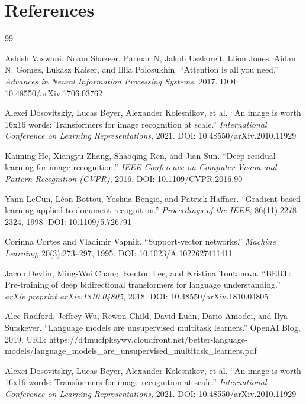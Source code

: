 \documentclass{article}
\begin{document}
\section{References}

\begin{thebibliography}{99}


Ashish Vaswani, Noam Shazeer, Parmar N, Jakob Uszkoreit, Llion Jones, Aidan N. Gomez, Łukasz Kaiser, and Illia Polosukhin.
``Attention is all you need.''
\textit{Advances in Neural Information Processing Systems}, 2017.
DOI: 10.48550/arXiv.1706.03762

Alexei Dosovitskiy, Lucas Beyer, Alexander Kolesnikov, et al.
``An image is worth 16x16 words: Transformers for image recognition at scale.''
\textit{International Conference on Learning Representations}, 2021.
DOI: 10.48550/arXiv.2010.11929

Kaiming He, Xiangyu Zhang, Shaoqing Ren, and Jian Sun.
``Deep residual learning for image recognition.''
\textit{IEEE Conference on Computer Vision and Pattern Recognition (CVPR)}, 2016.
DOI: 10.1109/CVPR.2016.90

Yann LeCun, Léon Bottou, Yoshua Bengio, and Patrick Haffner.
``Gradient-based learning applied to document recognition.''
\textit{Proceedings of the IEEE}, 86(11):2278--2324, 1998.
DOI: 10.1109/5.726791

Corinna Cortes and Vladimir Vapnik.
``Support-vector networks.''
\textit{Machine Learning}, 20(3):273--297, 1995.
DOI: 10.1023/A:1022627411411

Jacob Devlin, Ming-Wei Chang, Kenton Lee, and Kristina Toutanova.
``BERT: Pre-training of deep bidirectional transformers for language understanding.''
\textit{arXiv preprint arXiv:1810.04805}, 2018.
DOI: 10.48550/arXiv.1810.04805

Alec Radford, Jeffrey Wu, Rewon Child, David Luan, Dario Amodei, and Ilya Sutskever.
``Language models are unsupervised multitask learners.''
OpenAI Blog, 2019.
URL: https://d4mucfpksywv.cloudfront.net/better-language-models/language\_models\_are\_unsupervised\_multitask\_learners.pdf

Alexei Dosovitskiy, Lucas Beyer, Alexander Kolesnikov, et al.
``An image is worth 16x16 words: Transformers for image recognition at scale.''
\textit{International Conference on Learning Representations}, 2021.
DOI: 10.48550/arXiv.2010.11929


\end{thebibliography}
\end{document}
